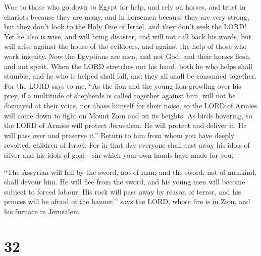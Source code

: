  Woe to those who go down to Egypt for help, and rely on
horses, and trust in chariots because they are many, and in horsemen
because they are very strong, but they don't look to the Holy One of
Israel, and they don't seek the LORD!  Yet he also is
wise, and will bring disaster, and will not call back his words, but
will arise against the house of the evildoers, and against the help of
those who work iniquity.  Now the Egyptians are men, and
not God; and their horses flesh, and not spirit. When the LORD stretches
out his hand, both he who helps shall stumble, and he who is helped
shall fall, and they all shall be consumed together.  For
the LORD says to me, ``As the lion and the young lion growling over his
prey, if a multitude of shepherds is called together against him, will
not be dismayed at their voice, nor abase himself for their noise, so
the LORD of Armies will come down to fight on Mount Zion and on its
heights.  As birds hovering, so the LORD of Armies will
protect Jerusalem. He will protect and deliver it. He will pass over and
preserve it.''  Return to him from whom you have deeply
revolted, children of Israel.  For in that day everyone
shall cast away his idols of silver and his idols of gold---sin which
your own hands have made for you.

 ``The Assyrian will fall by the sword, not of man; and
the sword, not of mankind, shall devour him. He will flee from the
sword, and his young men will become subject to forced labour.
 His rock will pass away by reason of terror, and his
princes will be afraid of the banner,'' says the LORD, whose fire is in
Zion, and his furnace in Jerusalem.

\hypertarget{section-31}{%
\section{32}\label{section-31}}

